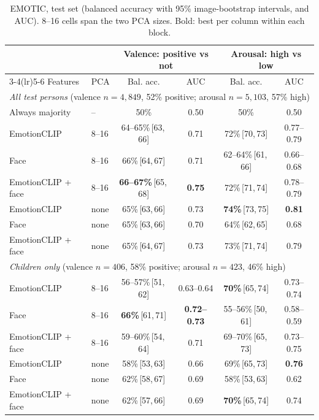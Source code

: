 \documentclass[11pt]{article}
\newcommand{\best}[1]{\textbf{#1}}
\newcommand{\ci}[2]{\,[#1,\,#2]}
\begin{document}
\begin{table}[h]
\centering
\caption{EMOTIC, test set (balanced accuracy with 95\% image-bootstrap intervals, and AUC). 8--16 cells span the two PCA sizes. Bold: best per column within each block.}
\label{tab:emotic}
\small
\begin{tabular}{llcccc}
\toprule
 & & \multicolumn{2}{c}{Valence: positive vs not} & \multicolumn{2}{c}{Arousal: high vs low} \\
\cmidrule(lr){3-4}\cmidrule(lr){5-6}
Features & PCA & Bal. acc. & AUC & Bal. acc. & AUC \\
\midrule
\multicolumn{6}{l}{\emph{All test persons} (valence $n{=}4{,}849$, 52\% positive; arousal $n{=}5{,}103$, 57\% high)} \\
Always majority & -- & 50\% & 0.50 & 50\% & 0.50 \\
EmotionCLIP & 8--16 & 64--65\%\ci{63}{66} & 0.71 & 72\%\ci{70}{73} & 0.77--0.79 \\
Face & 8--16 & 66\%\ci{64}{67} & 0.71 & 62--64\%\ci{61}{66} & 0.66--0.68 \\
EmotionCLIP + face & 8--16 & \best{66--67\%}\ci{65}{68} & \best{0.75} & 72\%\ci{71}{74} & 0.78--0.79 \\
EmotionCLIP & none & 65\%\ci{63}{66} & 0.73 & \best{74\%}\ci{73}{75} & \best{0.81} \\
Face & none & 65\%\ci{63}{66} & 0.70 & 64\%\ci{62}{65} & 0.68 \\
EmotionCLIP + face & none & 65\%\ci{64}{67} & 0.73 & 73\%\ci{71}{74} & 0.79 \\
\midrule
\multicolumn{6}{l}{\emph{Children only} (valence $n{=}406$, 58\% positive; arousal $n{=}423$, 46\% high)} \\
EmotionCLIP & 8--16 & 56--57\%\ci{51}{62} & 0.63--0.64 & \best{70\%}\ci{65}{74} & 0.73--0.74 \\
Face & 8--16 & \best{66\%}\ci{61}{71} & \best{0.72--0.73} & 55--56\%\ci{50}{61} & 0.58--0.59 \\
EmotionCLIP + face & 8--16 & 59--60\%\ci{54}{64} & 0.71 & 69--70\%\ci{65}{73} & 0.73--0.75 \\
EmotionCLIP & none & 58\%\ci{53}{63} & 0.66 & 69\%\ci{65}{73} & \best{0.76} \\
Face & none & 62\%\ci{58}{67} & 0.69 & 58\%\ci{53}{63} & 0.62 \\
EmotionCLIP + face & none & 62\%\ci{57}{66} & 0.69 & \best{70\%}\ci{65}{74} & 0.74 \\
\bottomrule
\end{tabular}
\end{table}
\end{document}
